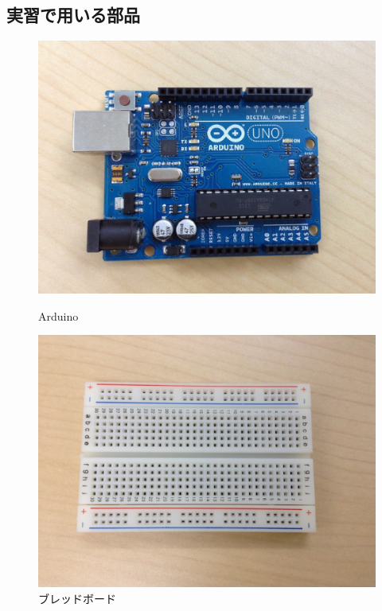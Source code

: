 \documentclass[11pt,a4paper]{jarticle}
\begin{document}
\subsection*{実習で用いる部品}
\begin{figure}[h!]
 \begin{minipage}{0.5\columnwidth}
  \centering
  \includegraphics[height=0.4\columnwidth]{arduino.eps}
  \caption{Arduino}
 \end{minipage}
 \begin{minipage}{0.5\columnwidth}
  \centering
  \includegraphics[height=0.4\columnwidth]{breadboard.eps}
  \caption{ブレッドボード}
 \end{minipage}
\end{figure}
\end{document}
